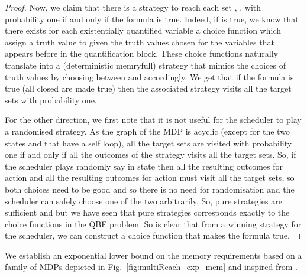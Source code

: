 \documentclass{llncs}
\begin{document}
\begin{proof}
   
  Now, we claim that there is a strategy to reach each set , , with probability one if and only if the formula  is true. Indeed, if  is true, we know that there exists for each existentially quantified variable  a choice function  which assign a truth value to  given the truth values chosen for the variables that appears before  in the quantification block. These choice functions naturally translate into a (deterministic memryfull) strategy that mimics the choices of truth values by choosing between  and  accordingly. We get that if the formula is true (all closed are made true) then the associated strategy visits all the target sets with probability one.   
  
  For the other direction, we first note that it is not useful for the scheduler to play a randomised strategy. As the graph of the MDP is acyclic (except for the two states  and  that have a self loop), all the target sets are visited with probability one if and only if all the outcomes of the strategy visits all the target sets. So, if the scheduler plays randomly say in state  then all the resulting outcomes for action  and all the resulting outcomes for action  must visit all the target sets, so both choices need to be good and so there is no need for randomisation and the scheduler can safely choose one of the two arbitrarily. So, pure strategies are sufficient and but we have seen that pure strategies corresponds exactly to the choice functions in the QBF problem. So is clear that from a winning strategy for the scheduler, we can construct a choice function that makes the formula true.
  \end{proof}


We establish an exponential lower bound on the memory requirements based on a family of MDPs depicted in Fig.~\ref{fig:multiReach_exp_mem} and inspired from \cite[Lemma 8]{DBLP:journals/acta/ChatterjeeRR14}.
\end{document}
